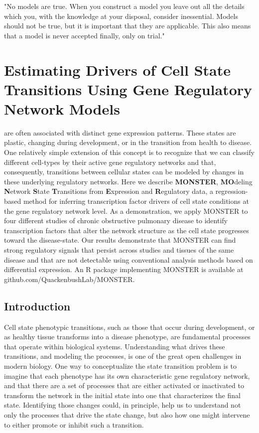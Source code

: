 \begin{savequote}[75mm]
"No models are true. When you construct a model you leave out all the details which you, with the knowledge at your disposal, consider inessential. Models should not be true, but it is important that they are applicable. This also means that a model is never accepted finally, only on trial."
\end{savequote}

\chapter{Estimating Drivers of Cell State Transitions Using Gene Regulatory Network Models}

 are often associated with distinct gene expression patterns. These states are plastic, changing during development, or in the transition from health to disease. One relatively simple extension of this concept is to recognize that we can classify different cell-types by their active gene regulatory networks and that, consequently, transitions between cellular states can be modeled by changes in these underlying regulatory networks. Here we describe \textbf{MONSTER}, \textbf{MO}deling \textbf{N}etwork \textbf{S}tate \textbf{T}ransitions from \textbf{E}xpression and \textbf{R}egulatory data, a regression-based method for inferring transcription factor drivers of cell state conditions at the gene regulatory network level. As a demonstration, we apply MONSTER to four different studies of chronic obstructive pulmonary disease to identify transcription factors that alter the network structure as the cell state progresses toward the disease-state. Our results demonstrate that MONSTER can find strong regulatory signals that persist across studies and tissues of the same disease and that are not detectable using conventional analysis methods based on differential expression. An R package implementing MONSTER is available at github.com/QuackenbushLab/MONSTER.

 
\section{Introduction}
Cell state phenotypic transitions, such as those that occur during development, or as healthy tissue transforms into a disease phenotype, are fundamental processes that operate within biological systems. Understanding what drives these transitions, and modeling the processes, is one of the great open challenges in modern biology. One way to conceptualize the state transition problem is to imagine that each phenotype has its own characteristic gene regulatory network, and that there are a set of processes that are either activated or inactivated to transform the network in the initial state into one that characterizes the final state. Identifying those changes could, in principle, help us to understand not only the processes that drive the state change, but also how one might intervene to either promote or inhibit such a transition.


